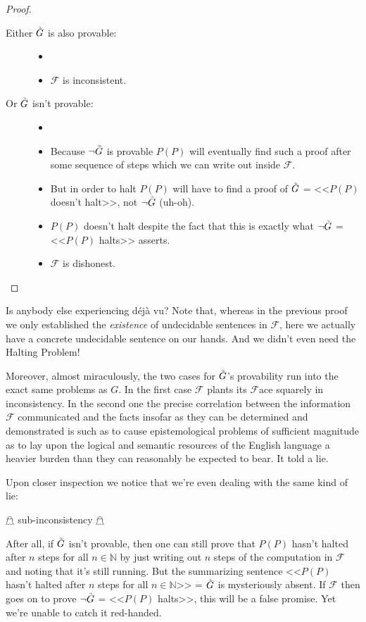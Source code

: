 \documentclass{article}
\theoremstyle{customstyle}
\newcommand{\F}{\ensuremath{\mathcal{F}}}
\newcommand{\iGoedel}{\ensuremath{\accentset{\scalebox{0.35}{$\infty$}}{G}}}
\begin{document}
\begin{proof}
\begin{description}
\begin{description}
\item[]
\item[Either $\iGoedel$ is also provable:]
\begin{itemize}
\item[]
\item $\F$ is inconsistent. \lightning
\end{itemize}
\item[Or $\iGoedel$ isn't provable:]
\begin{itemize}
\item[]
\item Because $\neg \iGoedel$ is provable $P(P)$ will eventually find such a proof after some sequence of steps which we can write out inside $\F$.
\item But in order to halt $P(P)$ will have to find a proof of $\iGoedel$ = <<$P(P)$ doesn't halt>>, not $\neg \iGoedel$ (uh-oh).
\item $P(P)$ doesn't halt despite the fact that this is exactly what $\neg \iGoedel$ = <<$P(P)$ halts>> asserts.
\item $\F$ is dishonest. \lightning
\end{itemize}
\end{description}
\end{description}
\end{proof}

Is anybody else experiencing déjà vu? Note that, whereas in the previous proof we only established the \textit{existence} of undecidable sentences in $\F$, here we actually have a concrete undecidable sentence on our hands. And we didn't even need the Halting Problem!

Moreover, almost miraculously, the two cases for $\iGoedel$'s provability run into the exact same problems as $G$. In the first case $\F$ plants its $\F$ace squarely in inconsistency. In the second one the precise correlation between the information $\F$ communicated and the facts insofar as they can be determined and demonstrated is such as to cause epistemological problems of sufficient magnitude as to lay upon the logical and semantic resources of the English language a heavier burden than they can reasonably be expected to bear. It told a lie.\cite{yes-prime-minister}

Upon closer inspection we notice that we're even dealing with the same kind of lie:
\begin{center}
$\mathghost$ sub-inconsistency $\mathghost$
\end{center}
After all, if $\iGoedel$ isn't provable, then one can still prove that $P(P)$ hasn't halted after $n$ steps for all $n\in\mathbb{N}$ by just writing out $n$ steps of the computation in $\F$ and noting that it's still running. But the summarizing sentence <<$P(P)$ hasn't halted after $n$ steps for all $n\in\mathbb{N}$>> = $\iGoedel$ is mysteriously absent. If $\F$ then goes on to prove $\neg \iGoedel$ = <<$P(P)$ halts>>, this will be a false promise. Yet we're unable to catch it red-handed.
\end{document}
